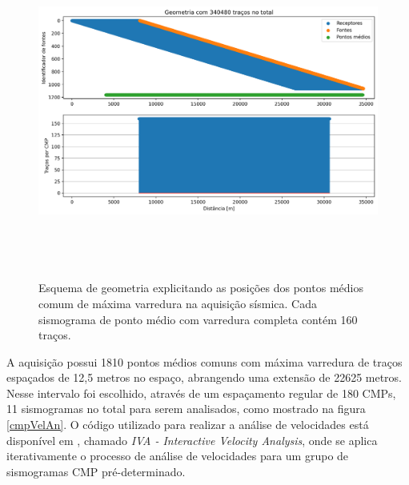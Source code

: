 \documentclass[
	12pt,				%
	openright,			%
	oneside,			%
	a4paper,			%
	english,			%
	brazil				%
	]{abntex2}
\begin{document}
    \begin{figure}[htp!]
		\centering
		\includegraphics[width=16cm,height=11cm]{../imagens/cmpTraceCountFullFold.png}
		\caption{Esquema de geometria explicitando as posições dos pontos médios comum de máxima varredura na aquisição sísmica. Cada sismograma de ponto médio com varredura completa contém 160 traços.}
		\label{cmpFullFold}
	\end{figure}
	
	A aquisição possui 1810 pontos médios comuns com máxima varredura de traços espaçados de 12,5 metros no espaço, abrangendo uma extensão de 22625 metros. Nesse intervalo foi escolhido, através de um espaçamento regular de 180 CMPs, 11 sismogramas no total para serem analisados, como mostrado na figura \ref{cmpVelAn}. O código utilizado para realizar a análise de velocidades está disponível em , chamado \textit{IVA - Interactive Velocity Analysis}, onde se aplica iterativamente o processo de análise de velocidades para um grupo de sismogramas CMP pré-determinado.         
	
\end{document}
